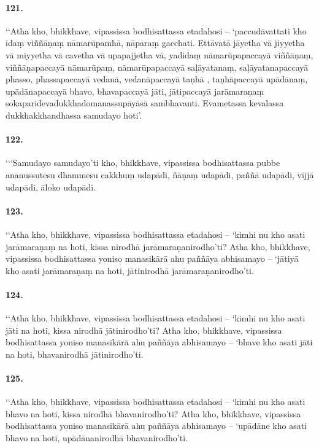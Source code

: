 \paragraph{121.} ‘‘Atha kho, bhikkhave, vipassissa bodhisattassa etadahosi – ‘paccudāvattati kho idaṃ viññāṇaṃ nāmarūpamhā, nāparaṃ gacchati. Ettāvatā jāyetha vā jiyyetha vā miyyetha vā cavetha vā upapajjetha vā, yadidaṃ nāmarūpapaccayā viññāṇaṃ, viññāṇapaccayā nāmarūpaṃ, nāmarūpapaccayā saḷāyatanaṃ, saḷāyatanapaccayā phasso, phassapaccayā vedanā, vedanāpaccayā taṇhā , taṇhāpaccayā upādānaṃ, upādānapaccayā bhavo, bhavapaccayā jāti, jātipaccayā jarāmaraṇaṃ sokaparidevadukkhadomanassupāyāsā sambhavanti. Evametassa kevalassa dukkhakkhandhassa samudayo hoti’.

\paragraph{122.} ‘‘‘Samudayo samudayo’ti kho, bhikkhave, vipassissa bodhisattassa pubbe ananussutesu dhammesu cakkhuṃ udapādi, ñāṇaṃ udapādi, paññā udapādi, vijjā udapādi, āloko udapādi.

\paragraph{123.} ‘‘Atha kho, bhikkhave, vipassissa bodhisattassa etadahosi – ‘kimhi nu kho asati jarāmaraṇaṃ na hoti, kissa nirodhā jarāmaraṇanirodho’ti? Atha kho, bhikkhave, vipassissa bodhisattassa yoniso manasikārā ahu paññāya abhisamayo – ‘jātiyā kho asati jarāmaraṇaṃ na hoti, jātinirodhā jarāmaraṇanirodho’ti.

\paragraph{124.} ‘‘Atha kho, bhikkhave, vipassissa bodhisattassa etadahosi – ‘kimhi nu kho asati jāti na hoti, kissa nirodhā jātinirodho’ti? Atha kho, bhikkhave, vipassissa bodhisattassa yoniso manasikārā ahu paññāya abhisamayo – ‘bhave kho asati jāti na hoti, bhavanirodhā jātinirodho’ti.

\paragraph{125.} ‘‘Atha kho, bhikkhave, vipassissa bodhisattassa etadahosi – ‘kimhi nu kho asati bhavo na hoti, kissa nirodhā bhavanirodho’ti? Atha kho, bhikkhave, vipassissa bodhisattassa yoniso manasikārā ahu paññāya abhisamayo – ‘upādāne kho asati bhavo na hoti, upādānanirodhā bhavanirodho’ti.


